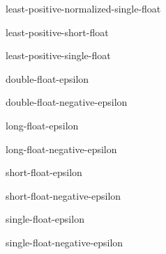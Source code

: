 \begin{constant}{least-positive-normalized-single-float}{}{}{}
  
\end{constant}

\begin{constant}{least-positive-short-float}{}{}{}
  
\end{constant}

\begin{constant}{least-positive-single-float}{}{}{}
  
\end{constant}

\begin{constant}{double-float-epsilon}{}{}{}
  
\end{constant}

\begin{constant}{double-float-negative-epsilon}{}{}{}
  
\end{constant}

\begin{constant}{long-float-epsilon}{}{}{}
  
\end{constant}

\begin{constant}{long-float-negative-epsilon}{}{}{}
  
\end{constant}

\begin{constant}{short-float-epsilon}{}{}{}
  
\end{constant}

\begin{constant}{short-float-negative-epsilon}{}{}{}
  
\end{constant}

\begin{constant}{single-float-epsilon}{}{}{}
  
\end{constant}

\begin{constant}{single-float-negative-epsilon}{}{}{}
  
\end{constant}
